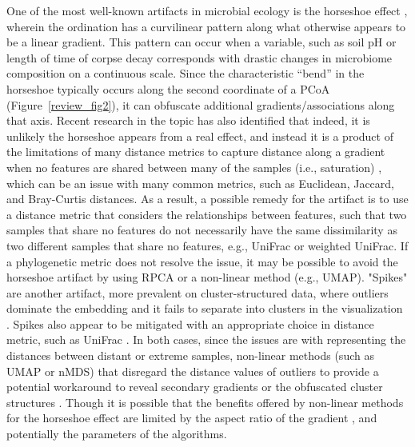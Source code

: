One of the most well-known artifacts in microbial ecology is the horseshoe effect \cite{Podani2002-vg}, wherein the ordination has a curvilinear pattern along what otherwise appears to be a linear gradient. This pattern can occur when a variable, such as soil pH \cite{Lauber2009-jo} or length of time of corpse decay \cite{Metcalf2016-iq} corresponds with drastic changes in microbiome composition on a continuous scale. Since the characteristic ``bend'' in the horseshoe typically occurs along the second coordinate of a PCoA (Figure~\ref{review_fig2}), it can obfuscate additional gradients/associations along that axis. Recent research in the topic has also identified that indeed, it is unlikely the horseshoe appears from a real effect, and instead it is a product of the limitations of many distance metrics to capture distance along a gradient when no features are shared between many of the samples (i.e., saturation) \cite{Morton2017-bs}, which can be an issue with many common metrics, such as Euclidean, Jaccard, and Bray-Curtis distances\cite{Morton2017-bs}. As a result, a possible remedy for the artifact is to use a distance metric  that considers the relationships between features, such that two samples that share no features do not necessarily have the same dissimilarity as two different samples that share no features, e.g., UniFrac or weighted UniFrac. If a phylogenetic metric does not resolve the issue, it may be possible to avoid the horseshoe artifact by using RPCA or a non-linear method (e.g., UMAP).  "Spikes" are another artifact, more prevalent on cluster-structured data, where outliers dominate the embedding and it fails to separate into clusters in the visualization \cite{Vazquez-Baeza2017-yp}. Spikes also appear to be mitigated with an appropriate choice in distance metric, such as UniFrac \cite{Hamady2009-jd}. In both cases, since the issues are with representing the distances between distant or extreme samples, non-linear methods (such as UMAP or nMDS) that disregard the distance values of outliers to provide a potential workaround to reveal secondary gradients or the obfuscated cluster structures \cite{Armstrong2021-tr}. Though it is possible that the benefits offered by non-linear methods for the horseshoe effect are limited by the aspect ratio of the gradient \cite{Kohli2021-fk}, and potentially the parameters of the algorithms.

